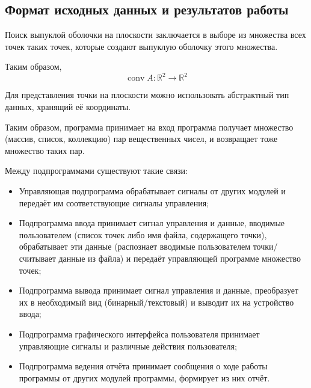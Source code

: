 \documentclass[a4paper,12pt,notitlepage,headsepline,pdftex]{scrartcl}
\begin{document}
  \subsection{Формат исходных данных и результатов работы}
    Поиск выпуклой оболочки на плоскости заключается в выборе из множества всех
    точек таких точек, которые создают выпуклую оболочку этого множества.

    Таким образом,
    \begin{equation}
      \mathop{conv} A : \mathbb{R}^2 \rightarrow \mathbb{R}^2
      \label{eq:1}
    \end{equation}

    Для представления точки на плоскости можно использовать абстрактный тип
    данных, хранящий её координаты.

    Таким образом, программа принимает на вход программа получает множество
    (массив, список, коллекцию) пар вещественных чисел, и возвращает тоже
    множество таких пар.

    Между подпрограммами существуют такие связи:
    \begin{itemize}
      \item Управляющая подпрограмма обрабатывает сигналы от других модулей и
        передаёт им соответствующие сигналы управления;
      \item Подпрограмма ввода принимает сигнал управления и данные, вводимые
        пользователем (список точек либо имя файла, содержащего точки),
        обрабатывает эти данные (распознает вводимые пользователем точки/считывает
        данные из файла) и передаёт управляющей программе множество точек;
      \item Подпрограмма вывода принимает сигнал управления и данные, преобразует
        их в необходимый вид (бинарный/текстовый) и выводит их на устройство
        ввода;
      \item Подпрограмма графического интерфейса пользователя принимает
        управляющие сигналы и различные действия пользователя;
      \item Подпрограмма ведения отчёта принимает сообщения о ходе работы
        программы от других модулей программы, формирует из них отчёт.
    \end{itemize}
\end{document}
